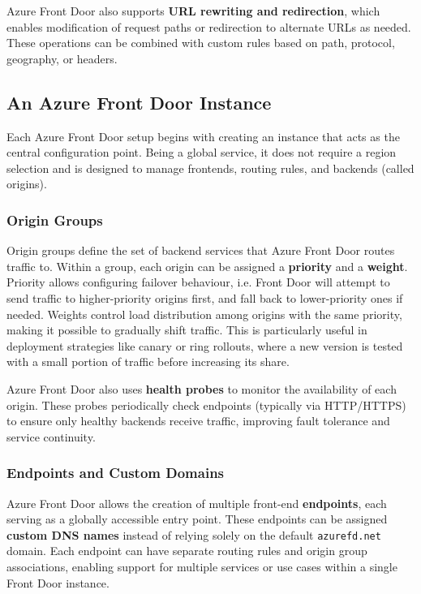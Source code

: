 \documentclass[12pt]{article}
\begin{document}
Azure Front Door also supports \textbf{URL rewriting and redirection}, which enables modification of request paths or redirection to alternate URLs as needed. These operations can be combined with custom rules based on path, protocol, geography, or headers.

\subsection{An Azure Front Door Instance}

Each Azure Front Door setup begins with creating an instance that acts as the central configuration point. Being a global service, it does not require a region selection and is designed to manage frontends, routing rules, and backends (called origins).

\subsubsection{Origin Groups}

Origin groups define the set of backend services that Azure Front Door routes traffic to. Within a group, each origin can be assigned a \textbf{priority} and a \textbf{weight}. Priority allows configuring failover behaviour, i.e. Front Door will attempt to send traffic to higher-priority origins first, and fall back to lower-priority ones if needed. Weights control load distribution among origins with the same priority, making it possible to gradually shift traffic. This is particularly useful in deployment strategies like canary or ring rollouts, where a new version is tested with a small portion of traffic before increasing its share.

Azure Front Door also uses \textbf{health probes} to monitor the availability of each origin. These probes periodically check endpoints (typically via HTTP/HTTPS) to ensure only healthy backends receive traffic, improving fault tolerance and service continuity.

\subsubsection{Endpoints and Custom Domains}

Azure Front Door allows the creation of multiple front-end \textbf{endpoints}, each serving as a globally accessible entry point. These endpoints can be assigned \textbf{custom DNS names} instead of relying solely on the default \texttt{azurefd.net} domain. Each endpoint can have separate routing rules and origin group associations, enabling support for multiple services or use cases within a single Front Door instance.
\end{document}
